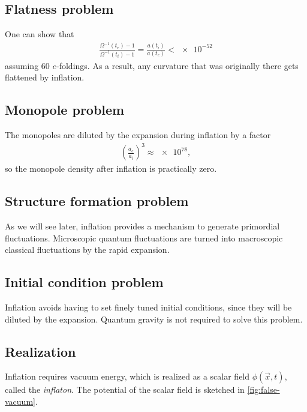 \subsection{Flatness problem}
One can show that
\begin{align*}
	\frac{\Omega^{-1}(t_e)-1}{\Omega^{-1}(t_i)-1}
	= \frac{a(t_i)}{a(t_e)}
	< \num{e-52}
\end{align*}
assuming $60$ $e$-foldings. As a result, any curvature that was originally there gets flattened by inflation.

\subsection{Monopole problem}
The monopoles are diluted by the expansion during inflation by a factor
\begin{align*}
	\left( \frac{a_e}{a_i} \right)^3 \approx \num{e78},
\end{align*}
so the monopole density after inflation is practically zero.

\subsection{Structure formation problem}
As we will see later, inflation provides a mechanism to generate primordial fluctuations. Microscopic quantum fluctuations are turned into macroscopic classical fluctuations by the rapid expansion.

\subsection{Initial condition problem}
Inflation avoids having to set finely tuned initial conditions, since they will be diluted by the expansion. Quantum gravity is not required to solve this problem.


\subsection{Realization}
Inflation requires vacuum energy, which is realized as a scalar field $\phi(\vec{x}, t)$, called the \emph{inflaton}. The potential of the scalar field is sketched in \cref{fig:false-vacuum}.

